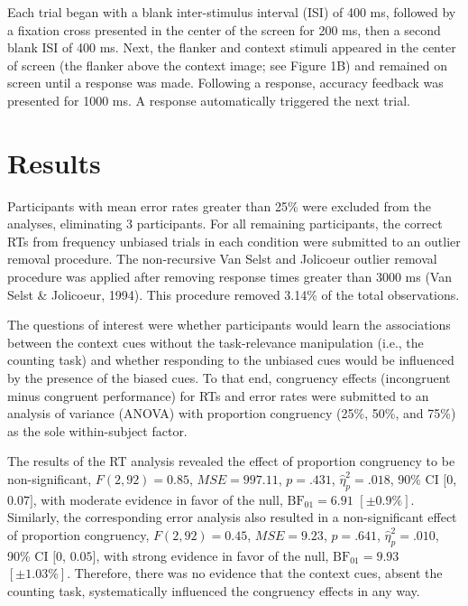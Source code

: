 \documentclass[english,,man,floatsintext]{apa6}
\begin{document}
Each trial began with a blank inter-stimulus interval (ISI) of 400 ms, followed by a fixation cross presented in the center of the screen for 200 ms, then a second blank ISI of 400 ms. Next, the flanker and context stimuli appeared in the center of screen (the flanker above the context image; see Figure 1B) and remained on screen until a response was made. Following a response, accuracy feedback was presented for 1000 ms. A response automatically triggered the next trial.

\hypertarget{results-1}{%
\section{Results}\label{results-1}}

Participants with mean error rates greater than 25\% were excluded from the analyses, eliminating 3 participants. For all remaining participants, the correct RTs from frequency unbiased trials in each condition were submitted to an outlier removal procedure. The non-recursive Van Selst and Jolicoeur outlier removal procedure was applied after removing response times greater than 3000 ms (Van Selst \& Jolicoeur, 1994). This procedure removed 3.14\% of the total observations.

The questions of interest were whether participants would learn the associations between the context cues without the task-relevance manipulation (i.e., the counting task) and whether responding to the unbiased cues would be influenced by the presence of the biased cues. To that end, congruency effects (incongruent minus congruent performance) for RTs and error rates were submitted to an analysis of variance (ANOVA) with proportion congruency (25\%, 50\%, and 75\%) as the sole within-subject factor.

The results of the RT analysis revealed the effect of proportion congruency to be non-significant, \(F(2, 92) = 0.85\), \(\mathit{MSE} = 997.11\), \(p = .431\), \(\hat{\eta}^2_p = .018\), 90\% CI \([0\), \(0.07]\), with moderate evidence in favor of the null, \(\mathrm{BF}_{\textrm{01}} = 6.91\) \([\pm 0.9\%]\). Similarly, the corresponding error analysis also resulted in a non-significant effect of proportion congruency, \(F(2, 92) = 0.45\), \(\mathit{MSE} = 9.23\), \(p = .641\), \(\hat{\eta}^2_p = .010\), 90\% CI \([0\), \(0.05]\), with strong evidence in favor of the null, \(\mathrm{BF}_{\textrm{01}} = 9.93\) \([\pm 1.03\%]\). Therefore, there was no evidence that the context cues, absent the counting task, systematically influenced the congruency effects in any way.
\end{document}

